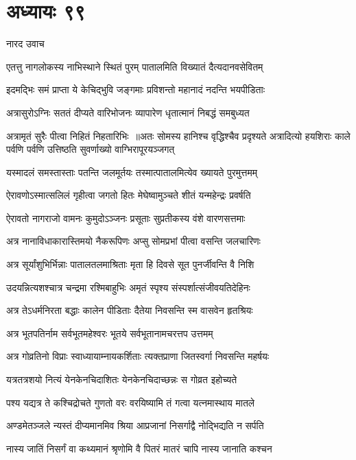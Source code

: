 \chapter{अध्यायः ९९}
\twolineshloka
{नारद उवाच}
{}


\twolineshloka
{एतत्तु नागलोकस्य नाभिस्थाने स्थितं पुरम्}
{पातालमिति विख्यातं दैत्यदानवसेवितम्}


\twolineshloka
{इदमद्भिः समं प्राप्ता ये केचिद्भुवि जङ्गमाः}
{प्रविशन्तो महानादं नदन्ति भयपीडिताः}


\twolineshloka
{अत्रासुरोऽग्निः सततं दीप्यते वारिभोजनः}
{व्यापारेण धृतात्मानं निबद्धं समबुध्यत}


अत्रामृतं सुरैः पीत्वा निहितं निहतारिभिः ॥अतः सोमस्य हानिश्च वृद्धिश्चैव प्रदृश्यते
\twolineshloka
{अत्रादित्यो हयशिराः काले पर्वणि पर्वणि}
{उत्तिष्ठति सुवर्णाख्यो वाग्भिरापूरयञ्जगत्}


\twolineshloka
{यस्मादलं समस्तास्ताः पतन्ति जलमूर्तयः}
{तस्मात्पातालमित्येव ख्यायते पुरमुत्तमम्}


\twolineshloka
{ऐरावणोऽस्मात्सलिलं गृहीत्वा जगतो हितः}
{मेघेष्वामुञ्चते शीतं यन्महेन्द्रः प्रवर्षति}


\twolineshloka
{ऐरावतो नागराजो वामनः कुमुदोऽञ्जनः}
{प्रसूताः सुप्रतीकस्य वंशे वारणसत्तमाः}


\twolineshloka
{अत्र नानाविधाकारास्तिमयो नैकरूपिणः}
{अप्सु सोमप्रभां पीत्वा वसन्ति जलचारिणः}


\twolineshloka
{अत्र सूर्यांशुभिर्भिन्नाः पातालतलमाश्रिताः}
{मृता हि दिवसे सूत पुनर्जीवन्ति वै निशि}


\twolineshloka
{उदयन्नित्यशश्चात्र चन्द्रमा रश्मिबाहुभिः}
{अमृतं स्पृश्य संस्पर्शात्संजीवयतिदेहिनः}


\twolineshloka
{अत्र तेऽधर्मनिरता बद्धाः कालेन पीडिताः}
{दैतेया निवसन्ति स्म वासवेन हृतश्रियः}


\twolineshloka
{अत्र भूतपतिर्नाम सर्वभूतमहेश्वरः}
{भूतये सर्वभूतानामचरत्तप उत्तमम्}


\twolineshloka
{अत्र गोव्रतिनो विप्राः स्वाध्यायाम्नायकर्शिताः}
{त्यक्तप्राणा जितस्वर्गा निवसन्ति महर्षयः}


\twolineshloka
{यत्रतत्रशयो नित्यं येनकेनचिदाशितः}
{येनकेनचिदाच्छन्नः स गोव्रत इहोच्यते}


\twolineshloka
{पश्य यद्यत्र ते कश्चिद्रोचते गुणतो वरः}
{वरयिष्यामि तं गत्वा यत्नमास्थाय मातले}


\twolineshloka
{अण्डमेतञ्जले न्यस्तं दीप्यमानमिव श्रिया}
{आप्रजानां निसर्गाद्वै नोद्भिद्यति न सर्पति}


\twolineshloka
{नास्य जातिं निसर्गं वा कथ्यमानं श्रृणोमि वै}
{पितरं मातरं चापि नास्य जानाति कश्चन}


